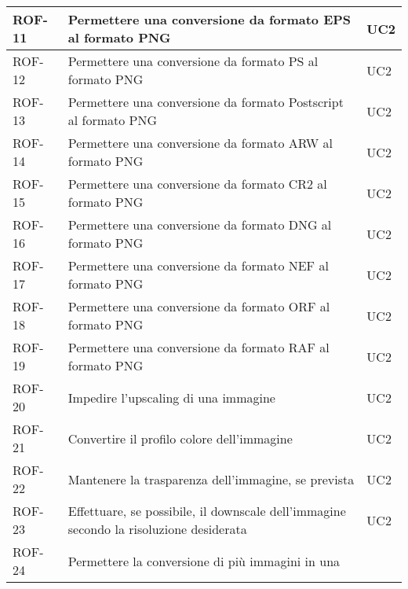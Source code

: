 \begin{table}[H]
\begin{tabularx}{\textwidth}{lXl}
        ROF-11             & Permettere una conversione da formato EPS al formato PNG           & UC2
        \\
        \hline
        ROF-12             & Permettere una conversione da formato PS al formato PNG            & UC2
        \\
        \hline
        ROF-13             & Permettere una conversione da formato Postscript al formato PNG
                           & UC2
        \\
        \hline
        ROF-14             & Permettere una conversione da formato ARW al formato PNG           & UC2
        \\
        \hline
        ROF-15             & Permettere una conversione da formato CR2 al formato PNG           & UC2
        \\
        \hline
        ROF-16             & Permettere una conversione da formato DNG al formato PNG           & UC2
        \\
        \hline
        ROF-17             & Permettere una conversione da formato NEF al formato PNG           & UC2
        \\
        \hline
        ROF-18             & Permettere una conversione da formato ORF al formato PNG           & UC2
        \\
        \hline
        ROF-19             & Permettere una conversione da formato RAF al formato PNG           & UC2
        \\
        \hline
        ROF-20             & Impedire l'upscaling di una immagine
                           & UC2                                                                                    \\
        \hline
        ROF-21             & Convertire il profilo colore dell'immagine
                           & UC2                                                                                    \\
        \hline
        ROF-22             & Mantenere la trasparenza dell'immagine, se prevista
                           & UC2                                                                                    \\
        \hline
        ROF-23             & Effettuare, se possibile, il downscale
        dell'immagine secondo la risoluzione desiderata
                           & UC2                                                                                    \\
        \hline
        ROF-24             & Permettere la conversione di più immagini in una

\end{tabularx}
\end{table}
